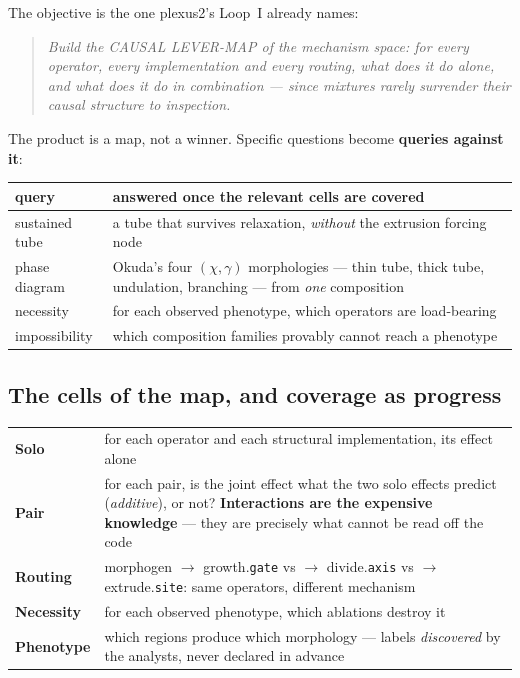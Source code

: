 \documentclass[11pt]{article}
\newcommand{\code}[1]{\texttt{#1}}
\begin{document}
The objective is the one plexus2's Loop~I already names:

\begin{quote}\itshape
Build the CAUSAL LEVER-MAP of the mechanism space: for every operator, every implementation and
every routing, what does it do \emph{alone}, and what does it do \emph{in combination} --- since
mixtures rarely surrender their causal structure to inspection.
\end{quote}

The product is a map, not a winner. Specific questions become \textbf{queries against it}:

\begin{center}\small
\begin{tabular}{@{}p{3.2cm}p{10.8cm}@{}}
\toprule
\textbf{query} & \textbf{answered once the relevant cells are covered} \\
\midrule
sustained tube & a tube that survives relaxation, \emph{without} the extrusion forcing node \\
phase diagram & Okuda's four $(\chi,\gamma)$ morphologies --- thin tube, thick tube, undulation,
branching --- from \emph{one} composition \\
necessity & for each observed phenotype, which operators are load-bearing \\
impossibility & which composition families provably cannot reach a phenotype \\
\bottomrule
\end{tabular}
\end{center}

\subsection{The cells of the map, and coverage as progress}

\begin{center}\small
\begin{tabular}{@{}p{2.2cm}p{11.8cm}@{}}
\toprule
\textbf{Solo} & for each operator and each structural implementation, its effect alone \\
\textbf{Pair} & for each pair, is the joint effect what the two solo effects predict
(\emph{additive}), or not? \textbf{Interactions are the expensive knowledge} --- they are
precisely what cannot be read off the code \\
\textbf{Routing} & morphogen $\to$ growth.\code{gate} vs $\to$ divide.\code{axis} vs $\to$
extrude.\code{site}: same operators, different mechanism \\
\textbf{Necessity} & for each observed phenotype, which ablations destroy it \\
\textbf{Phenotype} & which regions produce which morphology --- labels \emph{discovered} by the
analysts, never declared in advance \\
\bottomrule
\end{tabular}
\end{center}
\end{document}
